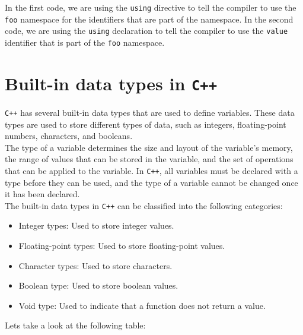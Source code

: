 In the first code, we are using the \texttt{using} directive to tell the compiler to use the \texttt{foo} namespace
for the identifiers that are part of the namespace. In the second code, we are using the \texttt{using} declaration
to tell the compiler to use the \texttt{value} identifier that is part of the \texttt{foo} namespace.\\

\section{Built-in data types in \texttt{C++}}

\texttt{C++} has several built-in data types that are used to define variables. These data types are used to store
different types of data, such as integers, floating-point numbers, characters, and booleans.\\

The type of a variable determines the size and layout of the variable's memory, the range of values that can be stored
in the variable, and the set of operations that can be applied to the variable. In \texttt{C++}, all variables must be
declared with a type before they can be used, and the type of a variable cannot be changed once it has been declared.\\

The built-in data types in \texttt{C++} can be classified into the following categories:

\begin{itemize}
    \item Integer types: Used to store integer values.
    \item Floating-point types: Used to store floating-point values.
    \item Character types: Used to store characters.
    \item Boolean type: Used to store boolean values.
    \item Void type: Used to indicate that a function does not return a value.
\end{itemize}

Lets take a look at the following table:

